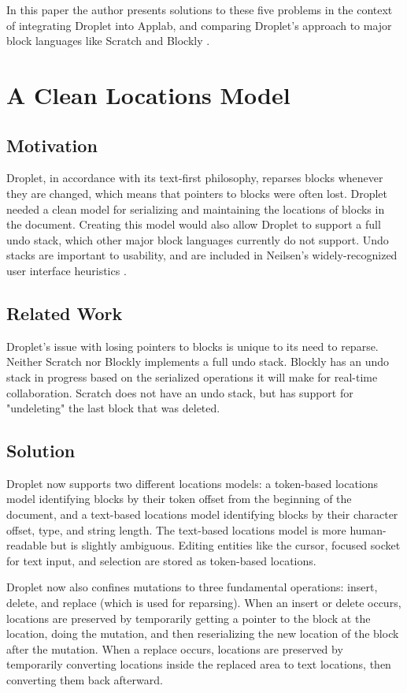 \documentclass[conference]{IEEEtran}
\begin{document}
In this paper the author presents solutions to these five problems in the context of integrating Droplet into Applab, and comparing Droplet's approach to major block languages like Scratch \cite{Scratch} and Blockly \cite{Blockly}.

\section{A Clean Locations Model}

\subsection{Motivation}
Droplet, in accordance with its text-first philosophy, reparses blocks whenever they are changed, which means that pointers to blocks were often lost. Droplet needed a clean model for serializing and maintaining the locations of blocks in the document. Creating this model would also allow Droplet to support a full undo stack, which other major block languages currently do not support. Undo stacks are important to usability, and are included in Neilsen's widely-recognized user interface heuristics \cite{Neilsen}.

\subsection{Related Work}
Droplet's issue with losing pointers to blocks is unique to its need to reparse. Neither Scratch nor Blockly implements a full undo stack. Blockly has an undo stack in progress based on the serialized operations it will make for real-time collaboration. Scratch does not have an undo stack, but has support for "undeleting" the last block that was deleted.

\subsection{Solution}
Droplet now supports two different locations models: a token-based locations model identifying blocks by their token offset from the beginning of the document, and a text-based locations model identifying blocks by their character offset, type, and string length. The text-based locations model is more human-readable but is slightly ambiguous. Editing entities like the cursor, focused socket for text input, and selection are stored as token-based locations.

Droplet now also confines mutations to three fundamental operations: insert, delete, and replace (which is used for reparsing). When an insert or delete occurs, locations are preserved by temporarily getting a pointer to the block at the location, doing the mutation, and then reserializing the new location of the block after the mutation. When a replace occurs, locations are preserved by temporarily converting locations inside the replaced area to text locations, then converting them back afterward.
\end{document}
